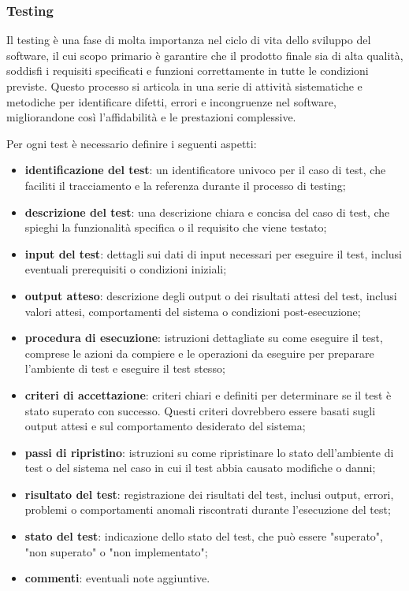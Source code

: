 \subsubsection{Testing} \label{testing}
Il testing è una fase di molta importanza nel ciclo di vita dello sviluppo del software, il cui scopo primario è garantire che il prodotto finale sia di alta qualità, soddisfi i requisiti specificati e funzioni correttamente in tutte le condizioni previste. Questo processo si articola in una serie di attività sistematiche e metodiche per identificare difetti, errori e incongruenze nel software, migliorandone così l'affidabilità e le prestazioni complessive.

Per ogni test è necessario definire i seguenti aspetti:
\begin{itemize}
	\item \textbf{identificazione del test}: un identificatore univoco per il caso di test, che faciliti il tracciamento e la referenza durante il processo di testing;
	\item \textbf{descrizione del test}: una descrizione chiara e concisa del caso di test, che spieghi la funzionalità specifica o il requisito che viene testato;
	\item \textbf{input del test}: dettagli sui dati di input necessari per eseguire il test, inclusi eventuali prerequisiti o condizioni iniziali;
	\item \textbf{output atteso}: descrizione degli output o dei risultati attesi del test, inclusi valori attesi, comportamenti del sistema o condizioni post-esecuzione;
	\item \textbf{procedura di esecuzione}: istruzioni dettagliate su come eseguire il test, comprese le azioni da compiere e le operazioni da eseguire per preparare l'ambiente di test e eseguire il test stesso;
	\item \textbf{criteri di accettazione}: criteri chiari e definiti per determinare se il test è stato superato con successo. Questi criteri dovrebbero essere basati sugli output attesi e sul comportamento desiderato del sistema;
	\item \textbf{passi di ripristino}: istruzioni su come ripristinare lo stato dell'ambiente di test o del sistema nel caso in cui il test abbia causato modifiche o danni;
	\item \textbf{risultato del test}: registrazione dei risultati del test, inclusi output, errori, problemi o comportamenti anomali riscontrati durante l'esecuzione del test;
	\item \textbf{stato del test}: indicazione dello stato del test, che può essere "superato", "non superato" o "non implementato";
	\item \textbf{commenti}: eventuali note aggiuntive.
\end{itemize}

